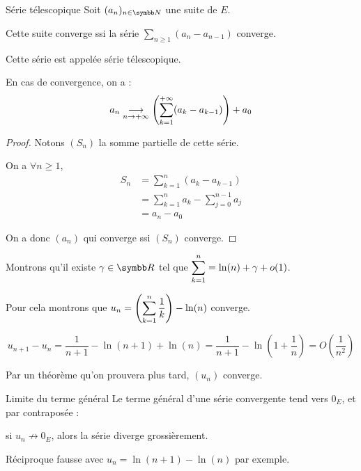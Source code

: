 \begin{theoreme}{Série télescopique}{}
    Soit $(a_n)_{n \in \N}$ une suite de $E$. 

    Cette suite converge ssi la série $\sum_{n \geqslant 1} (a_n - a_{n-1})$ converge.

    Cette série est appelée série télescopique. 

    En cas de convergence, on a : 
    \[a_n \underset{n \to + \infty}{\longrightarrow} \left( \sum_{k = 1 }^{+ \infty } (a_k - a_{k-1}) \right) + a_0\]
\end{theoreme}

\begin{proof}
    Notons $(S_n)$ la somme partielle de cette série. 

    On a $\forall n \geqslant 1$,
    \begin{align*}
        S_n & = \sum_{k=1}^n (a_k - a_{k-1}) \\
            & = \sum_{k=1}^n a_k - \sum_{j=0}^{n-1} a_j \\
            & = a_n - a_0
    \end{align*}

    On a donc $(a_n)$ qui converge ssi $(S_n)$ converge.
\end{proof}

\begin{exemple}
    Montrons qu'il existe $\gamma \in \R$ tel que $\displaystyle \sum_{k=1}^n = \ln(n) + \gamma + o(1)$.
    
    Pour cela montrons que $\displaystyle u_n = \left(\sum^n_{k=1} \frac 1 k\right) - \ln(n)$ converge.

    \[u_{n+1} - u_n = \frac 1 {n+1} - \ln(n+1) + \ln(n) = \frac 1 {n+1} - \ln\left(1 + \frac 1 n\right) = O\left(\frac 1 {n^2}\right)\]
    
    Par un théorème qu'on prouvera plus tard, $(u_n)$ converge.
\end{exemple}

\begin{theoreme}{Limite du terme général}{}
    Le terme général d'une série convergente tend vers $0_E$, et par contraposée :
    \begin{center}
    si $u_n \not \longrightarrow 0_E$, alors la série diverge grossièrement.
    \end{center}
\end{theoreme}

\begin{remarque}
    Réciproque fausse avec $u_n = \ln(n + 1) - \ln(n)$ par exemple. 
\end{remarque}


